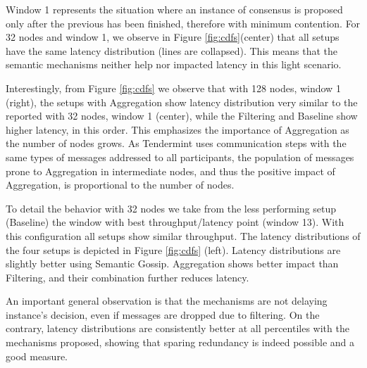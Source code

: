 Window 1 represents the situation where an instance of consensus is proposed only after the previous has been finished, therefore with minimum contention.
%
For 32 nodes and window 1, we observe in Figure \ref{fig:cdfs}(center) that all setups have the same latency distribution (lines are collapsed).  This means that the semantic mechanisms neither help nor impacted latency in this light scenario.

Interestingly, from Figure \ref{fig:cdfs} we observe that with 128 nodes, window 1 (right), the setups with Aggregation show latency distribution very similar to the reported with 32 nodes, window 1 (center), while the Filtering and Baseline show higher latency, in this order.
%
This emphasizes the 
importance of Aggregation as the number of nodes grows.  As Tendermint uses communication steps with the same types of messages addressed to all participants, the population of messages prone to Aggregation in intermediate nodes, and thus the positive impact of Aggregation, is proportional to the number of nodes.  
%



To detail the behavior with 32 nodes we take from the less performing setup (Baseline) the window with best throughput/latency point (window 13).
With this configuration all setups show similar throughput.
The latency distributions of the four setups is depicted in Figure \ref{fig:cdfs} (left).  %
Latency distributions are slightly better using Semantic Gossip. Aggregation shows  better impact than Filtering, and their combination further reduces latency.   

An important general observation is that the mechanisms are not delaying instance's decision, even if messages are dropped due to filtering.  On the contrary, latency distributions are consistently better at all percentiles with the mechanisms proposed, showing that sparing redundancy is indeed possible and a good measure.


